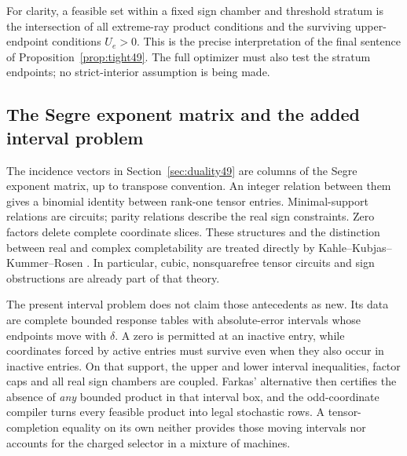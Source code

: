 For clarity, a feasible set within a fixed sign chamber and threshold
stratum is the intersection of all extreme-ray product conditions
and the surviving upper-endpoint conditions $U_e>0$. This is the
precise interpretation of the final sentence of
Proposition~\ref{prop:tight49}. The full optimizer must also test the
stratum endpoints; no strict-interior assumption is being made.

\subsection{The Segre exponent matrix and the added interval problem}
The incidence vectors in Section~\ref{sec:duality49} are columns of the
Segre exponent matrix, up to transpose convention. An integer relation
between them gives a binomial identity between rank-one tensor entries.
Minimal-support relations are circuits; parity relations describe the
real sign constraints. Zero factors delete complete coordinate slices.
These structures and the distinction between real and complex
completability are treated directly by Kahle--Kubjas--Kummer--Rosen
\cite[Section 2, especially Proposition 2.2, Remarks 2.3--2.5 and
Proposition 2.7]{KKKR17}. In particular, cubic, nonsquarefree tensor
circuits and sign obstructions are already part of that theory.

The present interval problem does not claim those antecedents as new.
Its data are complete bounded response tables with absolute-error
intervals whose endpoints move with $\delta$. A zero is permitted at
an inactive entry, while coordinates forced by active entries must
survive even when they also occur in inactive entries. On that support,
the upper and lower interval inequalities, factor caps and all real
sign chambers are coupled. Farkas' alternative then certifies the
absence of \emph{any} bounded product in that interval box, and the
odd-coordinate compiler turns every feasible product into legal
stochastic rows. A tensor-completion equality on its own neither
provides those moving intervals nor accounts for the charged selector
in a mixture of machines.

